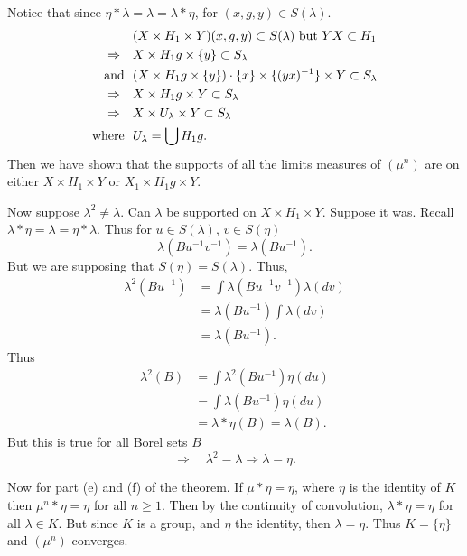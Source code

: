 Notice that since $\eta * \lambda = \lambda = \lambda * \eta$, for $(x,g,y) \in S(\lambda)$.
\[
\begin{aligned}
       &(X \times H_1 \times Y)(x,g,y) \subset S(\lambda) \hbox{ but } YX \subset H_1 \\
       \Rightarrow \quad &X \times H_1 g \times \{ y \} \subset S_\lambda              \\
       \hbox{and } \ &(X \times H_1 g \times \{ y \})
          \cdot \{ x \} \times \{ (yx)^{-1} \} \times Y \subset S_\lambda      \\
       \Rightarrow \quad &X \times H_1 g \times Y \subset S_\lambda                    \\
       \Rightarrow \quad &X \times U_\lambda \times Y \subset S_\lambda                    \\
       \hbox{where } \ &U_\lambda = \bigcup H_1 g.
\end{aligned}
\]
Then we have shown that the supports of all the limits measures of
$(\mu^n)$ are on either $X \times H_1 \times Y$ or $X_1 \times H_1 g \times Y$.

Now suppose $\lambda^2 \not= \lambda$.  Can $\lambda$ be supported on $X \times H_1 \times Y$.  
Suppose it was.  
Recall $\lambda * \eta = \lambda = \eta * \lambda$.
Thus for $u \in S(\lambda)$, $v \in S(\eta)$
\[
     \lambda(Bu^{-1}v^{-1}) = \lambda(Bu^{-1}).
\]
But we are supposing that $S(\eta) = S(\lambda)$.  
Thus,
\[
\begin{aligned}
       \lambda^2(Bu^{-1}) &= \int \lambda(Bu^{-1}v^{-1}) \lambda(dv)       \\
       &= \lambda(Bu^{-1}) \int \lambda(dv)                            \\
       &= \lambda(Bu^{-1}).
\end{aligned}
\]
Thus
\[
\begin{aligned}
       \lambda^2(B) &= \int \lambda^2(Bu^{-1}) \eta(du)                \\
       &= \int \lambda(Bu^{-1}) \eta(du)                           \\
       &= \lambda * \eta(B) = \lambda(B).
\end{aligned}
\]
But this is true for all Borel sets $B$
\[
     \Rightarrow \quad \lambda^2 = \lambda \Rightarrow \lambda = \eta.
\]

Now for part (e) and (f) of the theorem.  
If $\mu * \eta = \eta$, where $\eta$ is  the identity of $K$ then $\mu^n * \eta = \eta$ for all $n \ge 1$.  
Then by the continuity of convolution, $\lambda * \eta = \eta$ for all $\lambda \in K$.  
But since $K$ is a group, and $\eta$ the identity, then $\lambda = \eta$.  
Thus $K = \{ \eta \}$ and $(\mu^n)$ converges.

